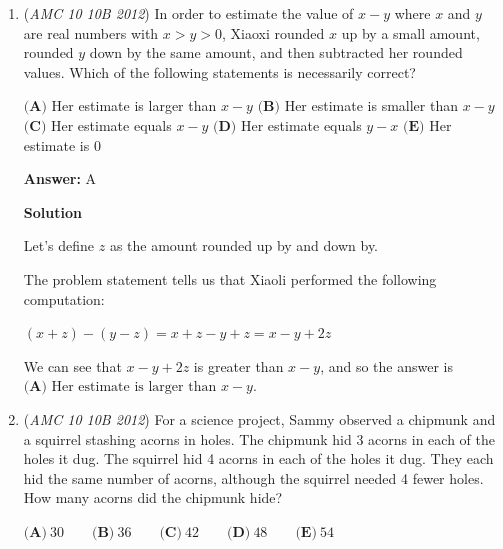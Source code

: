 \begin{enumerate}
 $\textbf{(A)}\ 18\qquad\textbf{(B)}\ 20\qquad\textbf{(C)}\ 21\qquad\textbf{(D)}\ 22\qquad\textbf{(E)}\ 24$

 \textbf{Answer: }D



\textbf{Solution}

Let $x$ be the cost of her dinner. 

 $27.50=x+\frac{1}{10}*x+\frac{3}{20}*x$
$27+\frac{1}{2}=\frac{5}{4}*x$
$\frac{55}{2}=\frac{5}{4}x$
$\frac{55}{2}*\frac{4}{5}=x$
$x=22$
$\boxed{\textbf{(D)}}$



	\item (\textit{AMC 10 10B 2012}) In order to estimate the value of $x-y$ where $x$ and $y$ are real numbers with $x > y > 0$, Xiaoxi rounded $x$ up by a small amount, rounded $y$ down by the same amount, and then subtracted her rounded values. Which of the following statements is necessarily correct? 


 $\textbf{(A)}$ Her estimate is larger than $x-y$
$\textbf{(B)}$ Her estimate is smaller than $x-y$
$\textbf{(C)}$ Her estimate equals $x-y$
$\textbf{(D)}$ Her estimate equals $y - x$
$\textbf{(E)}$ Her estimate is $0$

 \textbf{Answer: }A



\textbf{Solution}

Let's define $z$ as the amount rounded up by and down by.

 The problem statement tells us that Xiaoli performed the following computation:

 $\left(x+z\right) - \left(y-z\right) = x+z-y+z = x-y+2z$

 We can see that $x-y+2z$ is greater than $x-y$, and so the answer is $\boxed{\textbf{(A) } \text{Her estimate is larger than } x-y}$.

 


 


	\item (\textit{AMC 10 10B 2012}) For a science project, Sammy observed a chipmunk and a squirrel stashing acorns in holes. The chipmunk hid 3 acorns in each of the holes it dug. The squirrel hid 4 acorns in each of the holes it dug. They each hid the same number of acorns, although the squirrel needed 4 fewer holes. How many acorns did the chipmunk hide?


 $\textbf{(A)}\ 30\qquad\textbf{(B)}\ 36\qquad\textbf{(C)}\ 42\qquad\textbf{(D)}\ 48\qquad\textbf{(E)}\ 54$


\end{enumerate}
